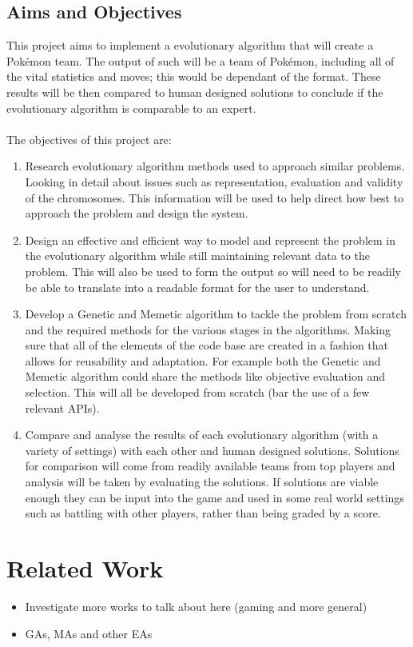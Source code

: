 \documentclass[a4paper]{article}
\newcommand{\Pokemon}{Pok\'{e}mon}
\begin{document}
\subsection{Aims and Objectives}
\par
This project aims to implement a evolutionary algorithm that will create a \Pokemon{} team.
The output of such will be a team of \Pokemon{}, including all of the vital statistics and moves; this would be dependant of the format.
These results will be then compared to human designed solutions to conclude if the evolutionary algorithm is comparable to an expert.
\\ \\The objectives of this project are:
\begin{enumerate}
    \item Research evolutionary algorithm methods used to approach similar problems.
    Looking in detail about issues such as representation, evaluation and validity of the chromosomes.
    This information will be used to help direct how best to approach the problem and design the system.
    \item Design an effective and efficient way to model and represent the problem in the evolutionary algorithm while still maintaining relevant data to the problem.
    This will also be used to form the output so will need to be readily be able to translate into a readable format for the user to understand.
    \item Develop a Genetic and Memetic algorithm to tackle the problem from scratch and the required methods for the various stages in the algorithms.
    Making sure that all of the elements of the code base are created in a fashion that allows for reusability and adaptation.
    For example both the Genetic and Memetic algorithm could share the methods like objective evaluation and selection.
    This will all be developed from scratch (bar the use of a few relevant APIs).
    \item Compare and analyse the results of each evolutionary algorithm (with a variety of settings) with each other and human designed solutions.
    Solutions for comparison will come from readily available teams from top players and analysis will be taken by evaluating the solutions.
    If solutions are viable enough they can be input into the game and used in some real world settings such as battling with other players, rather than being graded by a score.
\end{enumerate}

\section{Related Work}
\begin{itemize}
   \item Investigate more works to talk about here (gaming and more general)
   \item GAs, MAs and other EAs
\end{itemize}
\end{document}
